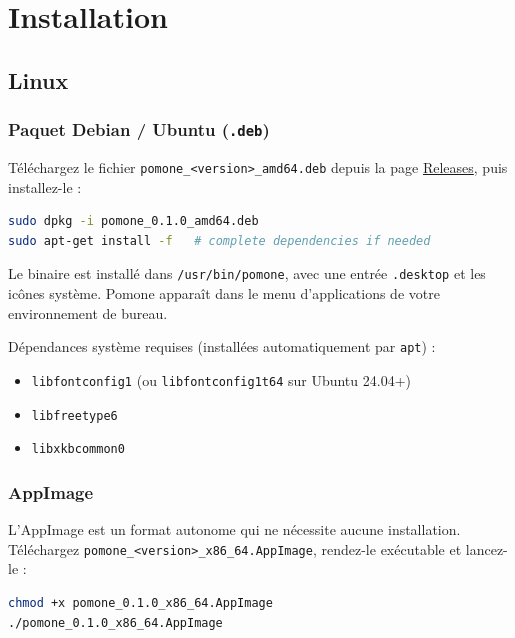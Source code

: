 \chapter{Installation}
\label{chap:installation}

\section{Linux}

\subsection{Paquet Debian / Ubuntu (\texttt{.deb})}

Téléchargez le fichier \texttt{pomone\_<version>\_amd64.deb} depuis la page \href{https://github.com/guycorbaz/pomone/releases}{Releases}, puis installez-le :

\begin{lstlisting}[language=bash]
sudo dpkg -i pomone_0.1.0_amd64.deb
sudo apt-get install -f   # complete dependencies if needed
\end{lstlisting}

Le binaire est installé dans \texttt{/usr/bin/pomone}, avec une entrée \texttt{.desktop} et les icônes système. Pomone apparaît dans le menu d'applications de votre environnement de bureau.

Dépendances système requises (installées automatiquement par \texttt{apt}) :

\begin{itemize}
  \item \texttt{libfontconfig1} (ou \texttt{libfontconfig1t64} sur Ubuntu 24.04+)
  \item \texttt{libfreetype6}
  \item \texttt{libxkbcommon0}
\end{itemize}

\subsection{AppImage}

L'AppImage est un format autonome qui ne nécessite aucune installation. Téléchargez \texttt{pomone\_<version>\_x86\_64.AppImage}, rendez-le exécutable et lancez-le :

\begin{lstlisting}[language=bash]
chmod +x pomone_0.1.0_x86_64.AppImage
./pomone_0.1.0_x86_64.AppImage
\end{lstlisting}

